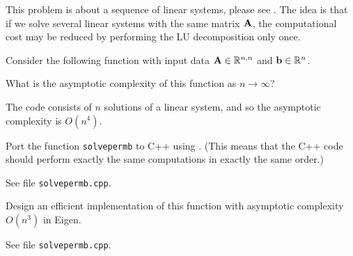 
\begin{problem}\label{prb:permb}
  This problem is about a sequence of linear systems, please see
  . The idea is that if we solve several linear systems with
  the same matrix ${\mathbf{A}}$, the computational cost may be reduced by performing the
  LU decomposition only once.

  Consider the following \matlab{} function with input data ${\mathbf{A}}\in\mathbb{R}^{n,n}$ and ${\mathbf{b}}\in\mathbb{R}^n$.



\begin{subproblem}[1]
What is the asymptotic complexity of this function as $n\to\infty$?
\begin{solution}
The code consists of $n$ solutions of a linear system, and so the asymptotic complexity is $O(n^4)$.
\end{solution}
\end{subproblem}

\begin{subproblem}[2]
  Port the \matlab{} function \lstinline|solvepermb| to C++ using \eigen{}.
  (This means that the C++ code should perform exactly the same computations in 
  exactly the same order.)
  \begin{solution}
    See file \texttt{solvepermb.cpp}.
  \end{solution}
\end{subproblem}

\begin{subproblem}[3]
Design an efficient implementation of this function with asymptotic complexity $O(n^3)$ in Eigen.
\begin{solution}
See file \texttt{solvepermb.cpp}.
\end{solution}
\end{subproblem}

\end{problem}
